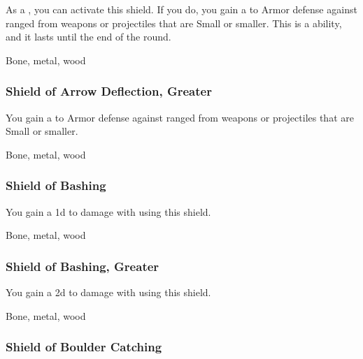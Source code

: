 As a , you can activate this shield.
If you do, you gain a   to Armor defense against ranged  from weapons or projectiles that are Small or smaller.
This is a  ability, and it lasts until the end of the round.



 Bone, metal, wood


\lowercase{\hypertarget{item:Shield of Arrow Deflection, Greater}{}}\label{item:Shield of Arrow Deflection, Greater}
\hypertarget{item:Shield of Arrow Deflection, Greater}{\subsubsection{Shield of Arrow Deflection, Greater\hfill{}}}

You gain a   to Armor defense against ranged  from weapons or projectiles that are Small or smaller.



 Bone, metal, wood


\lowercase{\hypertarget{item:Shield of Bashing}{}}\label{item:Shield of Bashing}
\hypertarget{item:Shield of Bashing}{\subsubsection{Shield of Bashing\hfill{}}}

You gain a \plus1d  to damage with  using this shield.



 Bone, metal, wood


\lowercase{\hypertarget{item:Shield of Bashing, Greater}{}}\label{item:Shield of Bashing, Greater}
\hypertarget{item:Shield of Bashing, Greater}{\subsubsection{Shield of Bashing, Greater\hfill{}}}

You gain a \plus2d  to damage with  using this shield.



 Bone, metal, wood


\lowercase{\hypertarget{item:Shield of Boulder Catching}{}}\label{item:Shield of Boulder Catching}
\hypertarget{item:Shield of Boulder Catching}{\subsubsection{Shield of Boulder Catching\hfill{}}}

